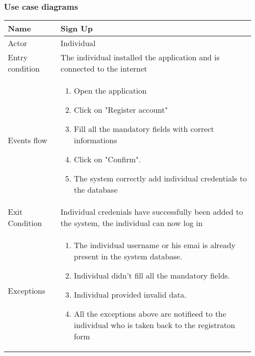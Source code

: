\subsubsection{Use case diagrams}



\begin{tabular}{|l|p{13cm}|}
    \hline
    Name & Sign Up
    \\ \hline
    Actor & Individual
    \\ \hline 
    Entry condition & The individual installed the application and is connected to the internet
    \\ \hline
    Events flow &
    \begin{enumerate}
    \item Open the application
    \item Click on "Register account"
    \item Fill all the mandatory fields with correct informations
    \item Click on "Confirm".
    \item The system correctly add individual credentials to the database
    \end{enumerate}
     \\ \hline
     Exit Condition & Individual credenials have successfully been added to the system,
     the individual can now log in     
     \\
    \hline
    Exceptions &
        \begin{enumerate}
    \item The individual username or his emai is already present in the system database.
    \item Individual didn't fill all the mandatory fields.
    \item Individual provided invalid data.
    \item All the exceptions above are notifieed to the individual who is taken back to the registraton form
    \end{enumerate}
      \\
    \hline
\end{tabular}


